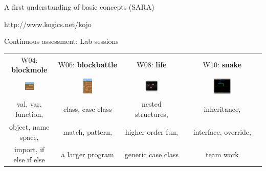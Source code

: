 \documentclass[aspectratio=169]{beamer}
\newenvironment{Slide}[1]%
  {\begin{frame}[environment=Slide]{#1}}
  {\end{frame}}%
\begin{document}
\begin{Slide}{A first understanding of basic concepts (SARA)}
\begin{minipage}{0.4\textwidth}
 \vfill{http://www.kogics.net/kojo}
\end{minipage}%
\end{Slide}  
  


\begin{Slide}{Continuous assessment: Lab sessions}
  \begin{tabular}{c c c c}
    W04: \textbf{blockmole} & W06: \textbf{blockbattle} & W08: \textbf{life} & W10: \textbf{snake} \\
  \includegraphics[width=0.2\textwidth]{Pictures/blockmole} &
  \includegraphics[width=0.15\textwidth]{Pictures/blockbattle} &
  \includegraphics[width=0.27\textwidth]{Pictures/life} &
  \includegraphics[width=0.25\textwidth]{Pictures/snake} 
  \\
  \small val, var, function, & \small class, case class & \small nested structures, & \small inheritance, \\
  \small object, name space, & \small match, pattern, & \small higher order fun, & \small interface, override, \\
  \small import, if else if else & \small a larger program & \small generic case class & \small team work\\
\end{tabular}%
\end{Slide}  
\end{document}
